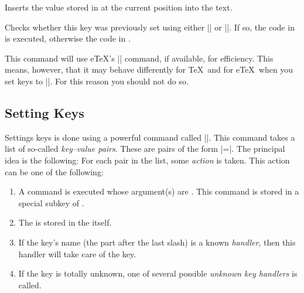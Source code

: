 \begin{command}{\pgfkeysvalueof{}}
    Inserts the value stored in  at the current position into
    the text.
\begin{codeexample}[]
\end{codeexample}
\end{command}

\begin{command}{\pgfkeysifdefined{}}
    Checks whether this key was previously set using either |\pgfkeyssetvalue|
    or |\pgfkeyslet|. If so, the code in  is executed, otherwise the
    code in .

    This command will use e\TeX's |\ifcsname| command, if available, for
    efficiency. This means, however, that it may behave differently for \TeX\
    and for e\TeX\ when you set keys to |\relax|. For this reason you should
    not do so.
\begin{codeexample}[]
\end{codeexample}
\end{command}


\subsection{Setting Keys}

Settings keys is done using a powerful command called |\pgfkeys|. This command
takes a list of so-called \emph{key--value pairs}. These are pairs of the form
\meta{key}|=|\meta{value}. The principal idea is the following: For each pair
in the list, some \emph{action} is taken. This action can be one of the
following:
%
\begin{enumerate}
    \item A command is executed whose argument(s) are . This
        command is stored in a special subkey of .
    \item The \meta{value} is stored in the \meta{key} itself.
    \item If the key's name (the part after the last slash) is a known
        \emph{handler}, then this handler will take care of the key.
    \item If the key is totally unknown, one of several possible \emph{unknown
        key handlers} is called.
\end{enumerate}

